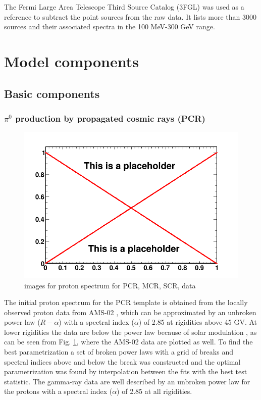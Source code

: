 The Fermi Large Area Telescope Third Source Catalog (3FGL) was used as a reference to subtract the point sources from the raw data. It lists more than 3000 sources and their associated spectra in the 100 MeV-300 GeV range.\\





\section{Model components}
\subsection{Basic components}

\subsubsection{$\pi^0$ production by propagated cosmic rays (PCR)}

\begin{figure}
 \centering
 \includegraphics[width=.9\linewidth]{pic/dummy.png}
 \caption{images for proton spectrum for PCR, MCR, SCR, data}
 \label{fig:proton_spec}
\end{figure}

The initial proton spectrum for the PCR template is obtained from the locally observed proton data from AMS-02 , which can be approximated by an unbroken power law ($R-\alpha$) with a spectral index ($\alpha$) of 2.85 at rigidities above 45 GV. At lower rigidities the data are below the power law because of solar modulation , as can be seen from Fig. \ref{fig:proton_spec}, where the AMS-02 data are plotted as well. To find the best parametrization a set of broken power laws with a grid of breaks and spectral indices above and below the break was constructed and the optimal parametrization was found by interpolation between the fits with the best test statistic. The gamma-ray data are well described by an unbroken power law for the protons with a spectral index ($\alpha$) of 2.85 at all rigidities.\\

